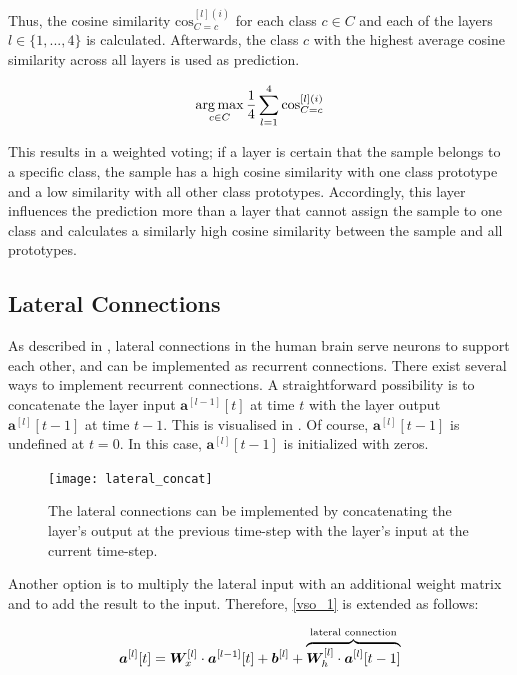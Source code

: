 Thus, the cosine similarity $\text{cos}^{[l](i)}_{C=c}$ for each class $c \in C$ and each of the layers $l \in \{1, ..., 4\}$ is calculated. Afterwards, the class $c$ with the highest average cosine similarity across all layers is used as prediction.

\begin{align}\eqlbl{vso_12}
		\argmax_{c \in C} \frac{1}{4} \sum_{l=1}^{4} \text{cos}^{[l](i)}_{C=c}
\end{align}

This results in a weighted voting; if a layer is certain that the sample belongs to a specific class, the sample has a high cosine similarity with one class prototype and a low similarity with all other class prototypes. Accordingly, this layer influences the prediction more than a layer that cannot assign the sample to one class and calculates a similarly high cosine similarity between the sample and all prototypes.

\subsection{Lateral Connections}
As described in , lateral connections in the human brain serve neurons to support each other, and  can be implemented as recurrent connections.
There exist several ways to implement recurrent connections. A straightforward possibility is to concatenate the layer input $\boldsymbol{a}^{[l-1]}[t]$ at time $t$ with the layer output $\boldsymbol{a}^{[l]}[t-1]$  at time $t-1$. This is visualised in . Of course, $\boldsymbol{a}^{[l]}[t-1]$ is undefined at $t=0$. In this case, $\boldsymbol{a}^{[l]}[t-1]$ is initialized with zeros.

\begin{figure}[h]
    \centering
    \texttt{[image: lateral\_concat]}
    \caption[Lateral connections by concatenating the layer's output with the layer's input]{The lateral connections can be implemented by concatenating the layer's output at the previous time-step with the layer's input at the current time-step.}
\end{figure}


Another option is to multiply the lateral input with an additional weight matrix and to add the result to the input. Therefore, \eqref{vso_1} is extended as follows:

\begin{align}\eqlbl{vso_13}
		\boldsymbol{a}^{[l]}[t] =  \boldsymbol{W}_x^{[l]} \cdot \boldsymbol{a}^{[l-1]}[t] + \boldsymbol{b}^{[l]} + \overbrace{\boldsymbol{W}_h^{[l]} \cdot \boldsymbol{a}^{[l]}[t-1] }^{\text{lateral connection}}
\end{align}

